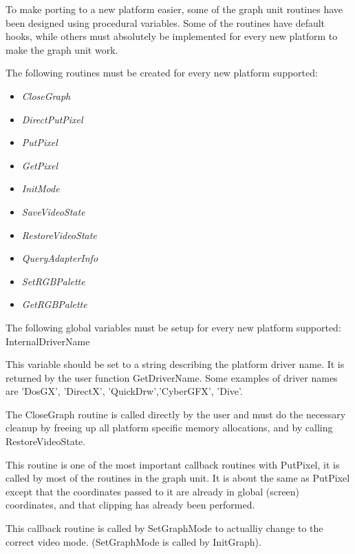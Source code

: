To make porting to a new platform easier, some of the graph unit routines
have been designed using procedural variables. Some of the routines have
default hooks, while others must absolutely be implemented for every new
platform to make the graph unit work.

The following routines must be created for every new platform supported:

\begin{itemize}
\item \textit{CloseGraph}
\item \textit{DirectPutPixel}
\item \textit{PutPixel}
\item \textit{GetPixel}
\item \textit{InitMode}
\item \textit{SaveVideoState}
\item \textit{RestoreVideoState}
\item \textit{QueryAdapterInfo}
\item \textit{SetRGBPalette}
\item \textit{GetRGBPalette}
\end{itemize}

The following global variables must be setup for every new platform
supported:
 InternalDriverName


This variable should be set to a string describing the platform driver
name. It is returned by the user function GetDriverName. Some examples
of driver names are 'DosGX', 'DirectX', 'QuickDrw','CyberGFX', 'Dive'.





The CloseGraph routine is called directly by the user and must
do the necessary cleanup by freeing up all platform specific
memory allocations, and by calling RestoreVideoState.


This routine is one of the most important callback routines with
PutPixel, it is called by most of the routines in the graph unit. It
is about the same as PutPixel except that the coordinates passed to
it are already in global (screen) coordinates, and that clipping has
already been performed.


This callback routine is called by SetGraphMode to actualliy change to
the correct video mode. (SetGraphMode is called by InitGraph).

